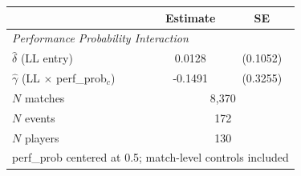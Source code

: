 \begin{tabular}{lcc}
\toprule
 & Estimate & SE \\
\midrule
\multicolumn{3}{l}{\textit{Performance Probability Interaction}} \\[3pt]
$\hat{\delta}$ (LL entry) & 0.0128 & (0.1052) \\
$\hat{\gamma}$ (LL $\times$ perf\_prob$_c$) & -0.1491 & (0.3255) \\
\midrule
$N$ matches & \multicolumn{2}{c}{8,370} \\
$N$ events & \multicolumn{2}{c}{172} \\
$N$ players & \multicolumn{2}{c}{130} \\
\multicolumn{3}{l}{perf\_prob centered at 0.5; match-level controls included} \\
\bottomrule
\end{tabular}
